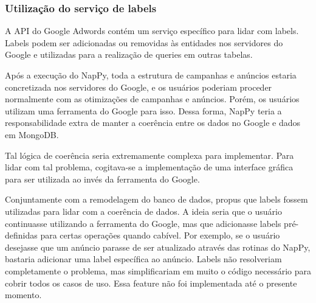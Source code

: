 \subsubsection{Utilização do serviço de labels}

A API do Google Adwords contém um serviço específico para
lidar com labels. Labels podem ser adicionadas ou removidas às
entidades nos servidores do Google e
utilizadas para a realização de queries em outras tabelas.

Após a execução do NapPy, toda a estrutura de campanhas e
anúncios estaria concretizada nos servidores do Google, e os
usuários poderiam proceder normalmente com as otimizações de
campanhas e anúncios. Porém, os usuários utilizam uma ferramenta
do Google para isso. Dessa forma, NapPy teria a responsabilidade
extra de manter a coerência entre os dados no Google e dados em
MongoDB.

Tal lógica de coerência seria extremamente complexa para
implementar. Para lidar com tal problema, cogitava-se a
implementação de uma interface gráfica para ser utilizada ao
invés da ferramenta do Google.

Conjuntamente com a remodelagem do banco de dados, propus que 
labels fossem utilizadas para lidar com a coerência de dados. A
ideia seria que o usuário continuasse utilizando a ferramenta do
Google, mas que adicionasse labels pré-definidas para certas
operações quando cabível. Por exemplo, se o usuário desejasse que
um anúncio parasse de ser atualizado através das rotinas do
NapPy, bastaria adicionar uma label específica ao anúncio. Labels não
resolveriam completamente o problema, mas simplificariam em muito
o código necessário para cobrir todos os casos de uso.
Essa feature não foi implementada até o presente momento.





